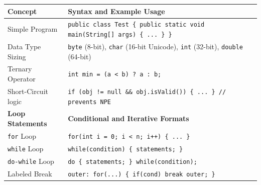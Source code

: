 \documentclass[12pt,a4paper]{article}
\renewcommand{\arraystretch}{1.45}
\begin{document}
\begin{tcolorbox}[formulabox, title={\textbf{Java Basic Syntax \& Loop Structures}}]
{\renewcommand{\arraystretch}{1.3}%
\begin{tabularx}{\linewidth}{l Y}
\textbf{Concept} & \textbf{Syntax and Example Usage} \\
\hline
Simple Program & \texttt{public class Test \{ public static void main(String[] args) \{ ... \} \}} \\
Data Type Sizing & \texttt{byte} (8-bit), \texttt{char} (16-bit Unicode), \texttt{int} (32-bit), \texttt{double} (64-bit) \\
Ternary Operator & \texttt{int min = (a < b) ? a : b;} \\
Short-Circuit logic & \texttt{if (obj != null \&\& obj.isValid()) \{ ... \} // prevents NPE} \\
\hline
\textbf{Loop Statements} & \textbf{Conditional and Iterative Formats} \\
\hline
\texttt{for} Loop & \texttt{for(int i = 0; i < n; i++) \{ ... \}} \\
\texttt{while} Loop & \texttt{while(condition) \{ statements; \}} \\
\texttt{do-while} Loop & \texttt{do \{ statements; \} while(condition);} \\
Labeled Break & \texttt{outer: for(...) \{ if(cond) break outer; \}} \\
\end{tabularx}}
\end{tcolorbox}
\end{document}
